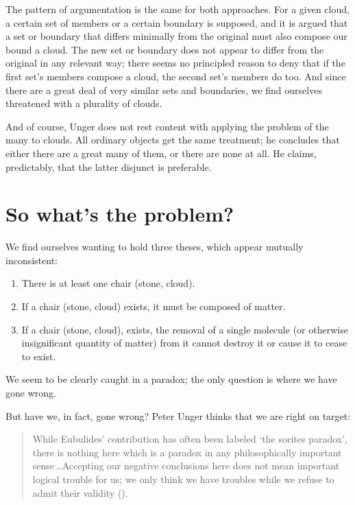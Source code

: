 \documentclass[11pt]{article}
\newenvironment{squote}{%
	\begin{quote}\begin{singlespace}%
	}{%
	\end{singlespace}\end{quote}}
\begin{document}
\begin{spacing}{1.5}
The pattern of argumentation is the same for both approaches.  For a
given cloud, a certain set of members or a certain boundary is
supposed, and it is argued that a set or boundary that differs
minimally from the original must also compose our bound a cloud.  The
new set or boundary does not appear to differ from the original in any
relevant way; there seems no principled reason to deny that if the
first set's members compose a cloud, the second set's members do too.
And since there are a great deal of very similar sets and boundaries,
we find ourselves threatened with a plurality of clouds.

And of course, Unger does not rest content with applying the problem
of the many to clouds.  All ordinary objects get the same treatment;
he concludes that either there are a great many of them, or there are
none at all.  He claims, predictably, that the latter disjunct is
preferable.

\section{So what's the problem?}
We find ourselves wanting to hold three theses, which appear mutually
inconsistent:

\begin{enumerate}
  \item There is at least one chair (stone, cloud).
  \item If a chair (stone, cloud) exists, it must be composed of
    matter.
  \item If a chair (stone, cloud), exists, the removal of a single
    molecule (or otherwise insignificant quantity of matter) from it
    cannot destroy it or cause it to cease to exist.
\end{enumerate}

We seem to be clearly caught in a paradox; the only question is where
we have gone wrong.

But have we, in fact, gone wrong?  Peter Unger thinks that we are
right on target:

\begin{squote}
While Eubulides' contribution has often been labeled `the sorites
paradox', there is nothing here which is a paradox in any
philosophically important sense\,\ldots Accepting our negative
conclusions here does not mean important logical trouble for us; we
only think we have troubles while we refuse to admit their validity
(\citeyear[145]{unger1979}).
\end{squote}


\end{spacing}
\end{document}

